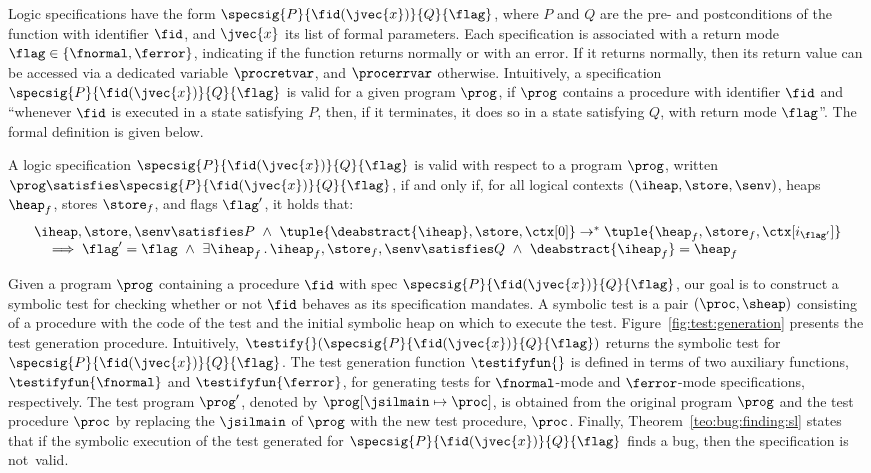 \jsil Logic specifications have the form $\specsig{P}{\fid(\jvec{x})}{Q}{\flag}$, where $P$ and $Q$ are the 
pre- and postconditions of the function with identifier $\fid$, and $\jvec{x}$ its list of formal parameters.
Each specification is associated with a return mode $\flag \in \{ \fnormal, \ferror \}$, indicating if the function
 returns normally or with an error. If it returns normally, then its return value can be accessed  via a dedicated variable 
 $\procretvar$, and $\procerrvar$ otherwise.  Intuitively, a specification $\specsig{P}{\fid(\jvec{x})}{Q}{\flag}$ is 
valid for a given \jsil program $\prog$, if $\prog$ contains a procedure with identifier 
$\fid$ and ``whenever $\fid$ is executed in a state satisfying $P$, then, 
if it terminates, it does so in a state satisfying $Q$, with return mode $\flag$''.
The formal definition is given below. 


\begin{definition}
A \jsil logic specification $\specsig{P}{\fid(\jvec{x})}{Q}{\flag}$ is valid with respect to a program 
$\prog$, written $\prog \satisfies \specsig{P}{\fid(\jvec{x})}{Q}{\flag}$,  if and only if, for all logical 
contexts $(\iheap, \store, \senv)$, heaps $\heap_f$, stores $\store_f$, and flags $\flag'$, it holds that: 
$$
\begin{array}{l}
    \iheap, \store, \senv \satisfies P \ \wedge \ \tuple{\deabstract{\iheap}, \store, \ctx[0]} \rightarrow^* \tuple{\heap_f, \store_f, \ctx[i_{\flag'}]} \\
       \quad \implies
            \flag' = \flag \ \wedge \ \exists \iheap_f \, . \, \iheap_f, \store_f, \senv \satisfies Q \ \wedge \ \deabstract{\iheap_f} = \heap_f
\end{array}
$$
\end{definition}

\noindent Given a \jsil program $\prog$ containing a procedure $\fid$ with spec {\small $\specsig{P}{\fid(\jvec{x})}{Q}{\flag}$}, 
our goal is to construct a symbolic test for checking whether or not $\fid$ behaves as its specification mandates.
A symbolic test is a pair $(\proc, \sheap)$ consisting of a \jsil procedure with the code of the test and the initial 
symbolic heap on which to execute the test. 
%
Figure~\ref{fig:test:generation} presents the test generation procedure. Intuitively, $\testify{}(\specsig{P}{\fid(\jvec{x})}{Q}{\flag})$ 
returns the symbolic test for $\specsig{P}{\fid(\jvec{x})}{Q}{\flag}$. The test generation function $\testifyfun{}$ is defined in terms 
of two auxiliary functions, $\testifyfun{\fnormal}$ and $\testifyfun{\ferror}$, for generating tests for $\fnormal$-mode and 
$\ferror$-mode specifications, respectively. 
The test program $\prog'$, denoted by $\prog[\jsilmain \mapsto \proc]$, is obtained from the original program $\prog$ and the test procedure $\proc$ by replacing the 
$\jsilmain$ of $\prog$ with the new test procedure, $\proc$. 
%
Finally, Theorem~\ref{teo:bug:finding:sl} states that if the symbolic execution of the 
test generated for $\specsig{P}{\fid(\jvec{x})}{Q}{\flag}$ finds a bug, then the specification 
is not~valid.


